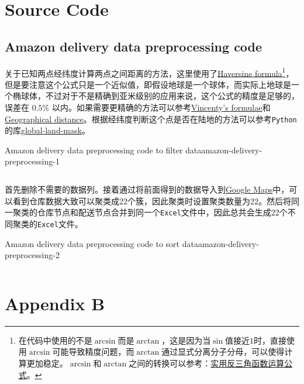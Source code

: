 \chapter{Source Code}

\section{Amazon delivery data preprocessing code}\label{sec:amazon-delivery-data-preprocessing-code}
关于已知两点经纬度计算两点之间距离的方法，这里使用了\href{https://www.wikiwand.com/en/articles/Haversine_formula}{Haversine formula}\footnote{在代码中使用的不是$\arcsin$而是$\arctan$，这是因为当$\sin$值接近$1$时，直接使用$\arcsin$可能导致精度问题，而$\arctan$通过显式分离分子分母，可以使得计算更加稳定。$\arcsin$和$\arctan$之间的转换可以参考：\href{https://zhuanlan.zhihu.com/p/111197233}{实用反三角函数运算公式}。}，但是要注意这个公式只是一个近似值，即假设地球是一个球体，而实际上地球是一个椭球体，不过对于不是精确到亚米级别的应用来说，这个公式的精度是足够的，误差在 $0.5\%$ 以内。如果需要更精确的方法可以参考\href{https://www.wikiwand.com/en/articles/Vincenty%27s_formulae}{Vincenty's formulae}和\href{https://www.wikiwand.com/en/articles/Geographical_distance}{Geographical distance}。根据经纬度判断这个点是否在陆地的方法可以参考\texttt{Python}的库\href{https://pypi.org/project/global-land-mask/}{global-land-mask}。

\begin{code}{Amazon delivery data preprocessing code to filter data}{amazon-delivery-preprocessing-1}
    \inputminted[highlightlines={5-13,44-48,3}]{python}{code/amazon_delivery/amazon_delivery_preprocessing_1.py}
\end{code}

首先删除不需要的数据列。接着通过将前面得到的数据导入到\href{https://www.google.com/maps/d/}{Google Maps}中，可以看到仓库数据大致可以聚类成22个簇，因此聚类时设置聚类数量为22。然后将同一聚类的仓库节点和配送节点合并到同一个\texttt{Excel}文件中，因此总共会生成22个不同聚类的\texttt{Excel}文件。

\begin{code}{Amazon delivery data preprocessing code to sort data}{amazon-delivery-preprocessing-2}
\inputminted{python}{code/amazon_delivery/amazon_delivery_preprocessing_2.py}
\end{code}

\chapter{Appendix B}
